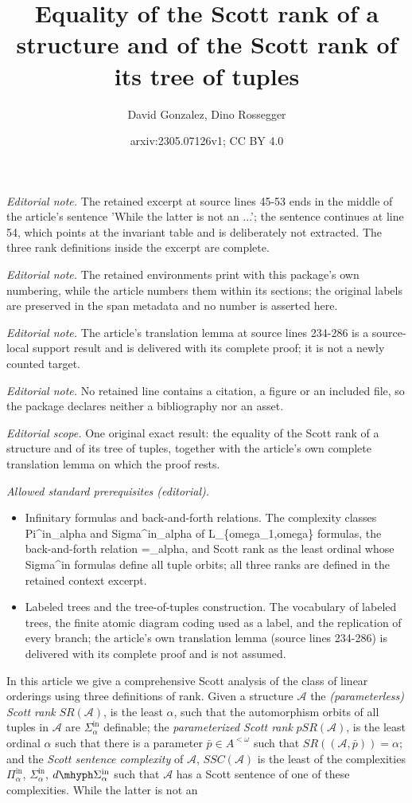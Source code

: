 \documentclass[10pt,a4paper]{amsart}
\title{Equality of the Scott rank of a structure and of the Scott rank of its tree of tuples}
\author{David Gonzalez, Dino Rossegger}
\date{arxiv:2305.07126v1; CC BY 4.0}
\providecommand{\A}{\mathcal{A}}
\providecommand{\Pinf}[1]{\Pi^{\mathrm{in}}_{#1}}
\providecommand{\Sinf}[1]{\Sigma^{\mathrm{in}}_{#1}}
\providecommand{\dSinf}[1]{d\mhyph\Sigma^{\mathrm{in}}_{#1}}
\providecommand{\bp}{\bar p}
\newcommand{\SR}{SR}
\newcommand{\pSR}{pSR}
\begin{document}
\maketitle
\noindent\textit{Editorial note.} The retained excerpt at source lines 45-53 ends in the middle of the article's sentence 'While the latter is not an ...'; the sentence continues at line 54, which points at the invariant table and is deliberately not extracted. The three rank definitions inside the excerpt are complete.\par\medskip
\noindent\textit{Editorial note.} The retained environments print with this package's own numbering, while the article numbers them within its sections; the original labels are preserved in the span metadata and no number is asserted here.\par\medskip
\noindent\textit{Editorial note.} The article's translation lemma at source lines 234-286 is a source-local support result and is delivered with its complete proof; it is not a newly counted target.\par\medskip
\noindent\textit{Editorial note.} No retained line contains a citation, a figure or an included file, so the package declares neither a bibliography nor an asset.\par\medskip
\noindent\textit{Editorial scope.} One original exact result: the equality of the Scott rank of a structure and of its tree of tuples, together with the article's own complete translation lemma on which the proof rests.\par\medskip
\noindent\textit{Allowed standard prerequisites (editorial).}\begin{itemize}
\item Infinitary formulas and back-and-forth relations. The complexity classes Pi\textasciicircum{}in\_alpha and Sigma\textasciicircum{}in\_alpha of L\_\{omega\_1,omega\} formulas, the back-and-forth relation =\_alpha, and Scott rank as the least ordinal whose Sigma\textasciicircum{}in formulas define all tuple orbits; all three ranks are defined in the retained context excerpt.
\item Labeled trees and the tree-of-tuples construction. The vocabulary of labeled trees, the finite atomic diagram coding used as a label, and the replication of every branch; the article's own translation lemma (source lines 234-286) is delivered with its complete proof and is not assumed.
\end{itemize}\medskip
In this article we give a comprehensive Scott analysis of the class of linear
orderings using three definitions of rank. Given a structure $\A$ the
\emph{(parameterless) Scott rank} $\SR(\A)$, is the least $\alpha$, such that
the automorphism orbits of all tuples in $\A$ are $\Sinf{\alpha}$ definable; the
\emph{parameterized Scott rank} $\pSR(\A)$, is the least ordinal $\alpha$ such
that there is a parameter $\bp\in A^{<\omega}$ such that $SR((\A,\bp))=\alpha$;
and the \emph{Scott sentence complexity} of $\A$, $SSC(\A)$ is the least of the
complexities $\Pinf{\alpha}$, $\Sinf{\alpha}$, $\dSinf{\alpha}$ such that $\A$
has a Scott sentence of one of these complexities. While the latter is not an
\end{document}
